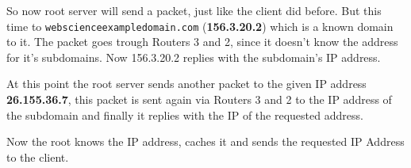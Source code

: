 \documentclass{WeSTassignment}
\begin{document}
So now root server will send a packet, just like the client did before. But this time to \texttt{webscienceexampledomain.com} (\textbf{156.3.20.2}) which is a known domain to it. The packet goes trough Routers 3 and 2, since it doesn't know the address for it's subdomains. Now 156.3.20.2 replies with the subdomain's IP address.

At this point the root server sends another packet to the given IP address \textbf{26.155.36.7}, this packet is sent again via Routers 3 and 2 to the IP address of the subdomain and finally it replies with the IP of the requested address.

Now the root knows the IP address, caches it and sends the requested IP Address to the client.





\makefooter
\end{document}

